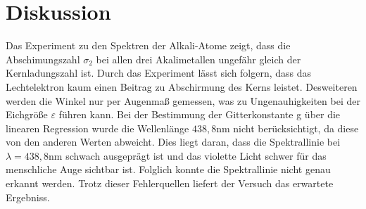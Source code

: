 \section{Diskussion}
\label{sec:Diskussion}
Das Experiment zu den Spektren der
Alkali-Atome zeigt, dass die Abschimungszahl
$\sigma_2$ bei allen drei Akalimetallen ungefähr gleich der
Kernladungszahl ist. Durch das Experiment lässt sich
folgern, dass das Lechtelektron kaum einen Beitrag zu Abschirmung
des Kerns leistet. Desweiteren werden die Winkel nur per Augenmaß gemessen,
was zu Ungenauhigkeiten bei der Eichgröße $\varepsilon$ führen kann. Bei der
Bestimmung der Gitterkonstante g über die linearen Regression wurde die
Wellenlänge $438,8\si{\nano\meter}$ nicht berücksichtigt, da
diese von den anderen Werten abweicht. Dies liegt daran, dass
die Spektrallinie bei $\lambda=438,8\si{\nano\meter}$
schwach ausgeprägt ist
und das violette Licht schwer für das menschliche Auge sichtbar ist.
Folglich konnte die Spektrallinie nicht genau erkannt werden. Trotz
dieser Fehlerquellen liefert der Versuch das erwartete Ergebniss.
